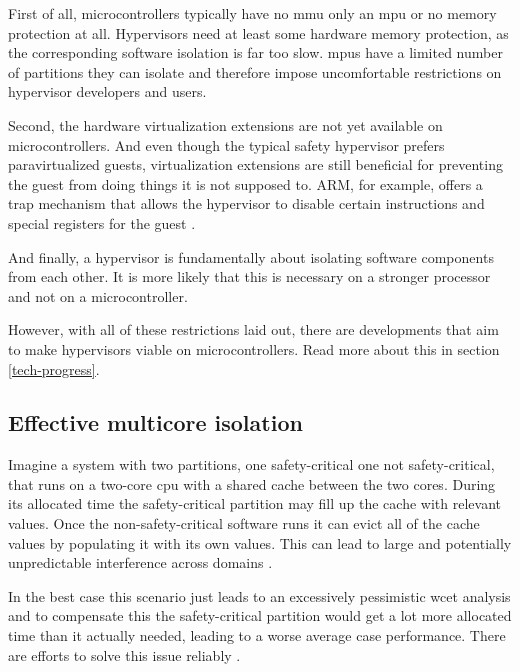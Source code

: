 First of all, microcontrollers typically have no \acrshort{mmu} only an \acrshort{mpu} or no memory protection at all. Hypervisors need at least some hardware memory protection, as the corresponding software isolation is far too slow. \acrshort{mpu}s have a limited number of partitions they can isolate and therefore impose uncomfortable restrictions on hypervisor developers and users.

Second, the hardware virtualization extensions are not yet available on microcontrollers. And even though the typical safety hypervisor prefers paravirtualized guests, virtualization extensions are still beneficial for preventing the guest from doing things it is not supposed to. ARM, for example, offers a trap mechanism that allows the hypervisor to disable certain instructions and special registers for the guest \cite{ARM.v8.2018}. 

And finally, a hypervisor is fundamentally about isolating software components from each other. It is more likely that this is necessary on a stronger processor and not on a microcontroller.

However, with all of these restrictions laid out, there are developments that aim to make hypervisors viable on microcontrollers. Read more about this in section \ref{tech-progress}.

\subsection{Effective multicore isolation}
Imagine a system with two partitions, one safety-critical one not safety-critical, that runs on a two-core \acrshort{cpu} with a shared cache between the two cores. During its allocated time the safety-critical partition may fill up the cache with relevant values. Once the non-safety-critical software runs it can evict all of the cache values by populating it with its own values. This can lead to large and potentially unpredictable interference across domains \cite{AlessandroBiondi.2018}.

In the best case this scenario just leads to an excessively pessimistic \acrfull{wcet} analysis and to compensate this the safety-critical partition would get a lot more allocated time than it actually needed, leading to a worse average case performance. There are efforts to solve this issue reliably \cite{PaoloModica.2018}.


